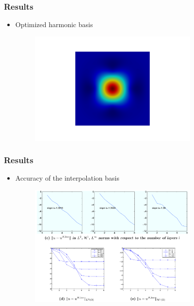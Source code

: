 \documentclass[serif,mathserif, 12pt]{beamer}
\begin{document}
\begin{frame}
  \frametitle{Results}
  \begin{itemize}
  \item Optimized harmonic basis
    \begin{figure}
      \includegraphics[width=0.8\textwidth]{img/my_harmonic_basis}
    \end{figure}
  \end{itemize}
\end{frame}

\begin{frame}
  \frametitle{Results}
  \begin{itemize}
  \item Accuracy of the interpolation basis
    \begin{figure}
      \includegraphics[width=0.8\textwidth]{img/in_basis_accuracy}
    \end{figure}
  \end{itemize}
\end{frame}

\begin{frame} 
\end{frame}
\end{document}
